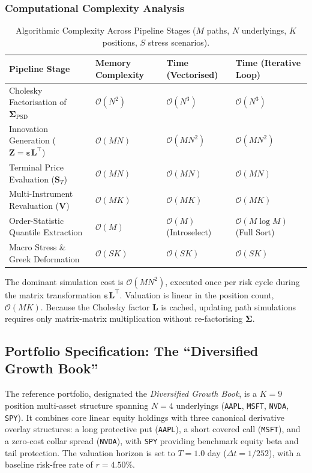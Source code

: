 \documentclass{article}
\theoremstyle{plain}
\theoremstyle{definition}
\theoremstyle{remark}
\begin{document}
\subsubsection{Computational Complexity Analysis}
\begin{table}[htbp]
\centering
\small
\caption{Algorithmic Complexity Across Pipeline Stages ($M$ paths, $N$ underlyings, $K$ positions, $S$ stress scenarios).}
\label{tab:complexity}
\begin{tabularx}{\textwidth}{lXXX}
\toprule
\textbf{Pipeline Stage} & \textbf{Memory Complexity} & \textbf{Time (Vectorised)} & \textbf{Time (Iterative Loop)} \\
\midrule
Cholesky Factorisation of $\mathbf{\Sigma}_{\text{PSD}}$ & $\mathcal{O}(N^2)$ & $\mathcal{O}(N^3)$ & $\mathcal{O}(N^3)$ \\
Innovation Generation ($\mathbf{Z} = \boldsymbol{\varepsilon}\mathbf{L}^\top$) & $\mathcal{O}(MN)$ & $\mathcal{O}(MN^2)$ & $\mathcal{O}(MN^2)$ \\
Terminal Price Evaluation ($\mathbf{S}_T$) & $\mathcal{O}(MN)$ & $\mathcal{O}(MN)$ & $\mathcal{O}(MN)$ \\
Multi-Instrument Revaluation ($\mathbf{V}$) & $\mathcal{O}(MK)$ & $\mathcal{O}(MK)$ & $\mathcal{O}(MK)$ \\
Order-Statistic Quantile Extraction & $\mathcal{O}(M)$ & $\mathcal{O}(M)$ (Introselect) & $\mathcal{O}(M \log M)$ (Full Sort) \\
Macro Stress \& Greek Deformation & $\mathcal{O}(SK)$ & $\mathcal{O}(SK)$ & $\mathcal{O}(SK)$ \\
\bottomrule
\end{tabularx}
\end{table}

The dominant simulation cost is $\mathcal{O}(MN^2)$, executed once per risk cycle during the matrix transformation $\boldsymbol{\varepsilon}\mathbf{L}^\top$. Valuation is linear in the position count, $\mathcal{O}(MK)$. Because the Cholesky factor $\mathbf{L}$ is cached, updating path simulations requires only matrix-matrix multiplication without re-factorising $\mathbf{\Sigma}$.

\subsection{Portfolio Specification: The ``Diversified Growth Book''}
The reference portfolio, designated the \textit{Diversified Growth Book}, is a $K=9$ position multi-asset structure spanning $N=4$ underlyings (\texttt{AAPL}, \texttt{MSFT}, \texttt{NVDA}, \texttt{SPY}). It combines core linear equity holdings with three canonical derivative overlay structures: a long protective put (\texttt{AAPL}), a short covered call (\texttt{MSFT}), and a zero-cost collar spread (\texttt{NVDA}), with \texttt{SPY} providing benchmark equity beta and tail protection. The valuation horizon is set to $T = 1.0$ day ($\Delta t = 1/252$), with a baseline risk-free rate of $r = 4.50\%$.
\end{document}
